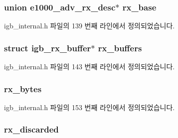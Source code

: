 \subsubsection[{\texorpdfstring{rx\+\_\+base}{rx_base}}]{\setlength{\rightskip}{0pt plus 5cm}union {\bf e1000\+\_\+adv\+\_\+rx\+\_\+desc}$\ast$ rx\+\_\+base}\hypertarget{structrx__ring_a40ec79b3b6a780e7f5c90dea8b3160bf}{}\label{structrx__ring_a40ec79b3b6a780e7f5c90dea8b3160bf}


igb\+\_\+internal.\+h 파일의 139 번째 라인에서 정의되었습니다.

\subsubsection[{\texorpdfstring{rx\+\_\+buffers}{rx_buffers}}]{\setlength{\rightskip}{0pt plus 5cm}struct {\bf igb\+\_\+rx\+\_\+buffer}$\ast$ rx\+\_\+buffers}\hypertarget{structrx__ring_abe41cfe713ffac28a8f678c51082df25}{}\label{structrx__ring_abe41cfe713ffac28a8f678c51082df25}


igb\+\_\+internal.\+h 파일의 143 번째 라인에서 정의되었습니다.

\subsubsection[{\texorpdfstring{rx\+\_\+bytes}{rx_bytes}}]{ rx\+\_\+bytes}\hypertarget{structrx__ring_a7959281142289cfe755e1b3279559b5f}{}\label{structrx__ring_a7959281142289cfe755e1b3279559b5f}


igb\+\_\+internal.\+h 파일의 153 번째 라인에서 정의되었습니다.

\subsubsection[{\texorpdfstring{rx\+\_\+discarded}{rx_discarded}}]{ rx\+\_\+discarded}\hypertarget{structrx__ring_a8e02d86f1d47bd0e3c5b45ffb9ba9d79}{}\label{structrx__ring_a8e02d86f1d47bd0e3c5b45ffb9ba9d79}


